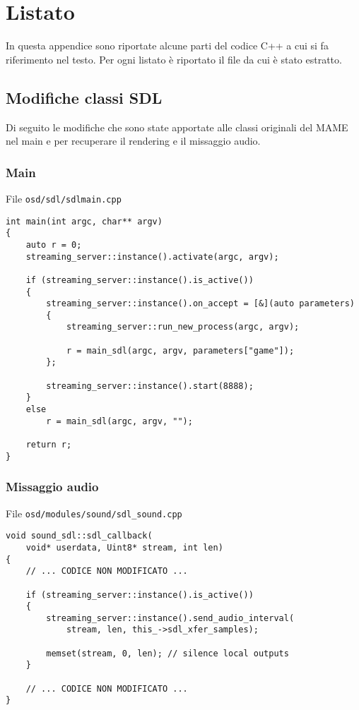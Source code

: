 \chapter{Listato}
In questa appendice sono riportate alcune parti del codice C++ a cui si fa riferimento nel testo. Per ogni listato è riportato il file da cui è stato estratto.

\section{Modifiche classi SDL}
Di seguito le modifiche che sono state apportate alle classi originali del MAME nel main e per recuperare il rendering e il missaggio audio.

\subsection{Main}
File \verb|osd/sdl/sdlmain.cpp|

\begin{verbatim}
int main(int argc, char** argv)
{
	auto r = 0;	
	streaming_server::instance().activate(argc, argv);

	if (streaming_server::instance().is_active())
	{
		streaming_server::instance().on_accept = [&](auto parameters)
		{
			streaming_server::run_new_process(argc, argv);

			r = main_sdl(argc, argv, parameters["game"]);
		};

		streaming_server::instance().start(8888);
	}
	else
		r = main_sdl(argc, argv, "");	

	return r;
}
\end{verbatim}


\subsection{Missaggio audio}
File \verb|osd/modules/sound/sdl_sound.cpp|

\begin{verbatim}
void sound_sdl::sdl_callback(
	void* userdata, Uint8* stream, int len)
{
	// ... CODICE NON MODIFICATO ...

	if (streaming_server::instance().is_active())
	{
		streaming_server::instance().send_audio_interval(
			stream, len, this_->sdl_xfer_samples);

		memset(stream, 0, len); // silence local outputs
	}

	// ... CODICE NON MODIFICATO ...
}
\end{verbatim}


